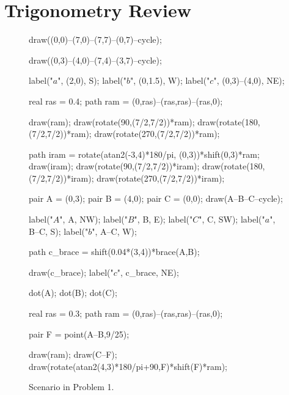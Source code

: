 \documentclass[../gatm.tex]{subfiles}
\begin{document}
\section{Trigonometry Review}

\begin{figure}[h]
	\begin{minipage}{0.45\textwidth}\centering
		\begin{center}
			\begin{asy}[width=\textwidth]
				draw((0,0)--(7,0)--(7,7)--(0,7)--cycle);
				
				draw((0,3)--(4,0)--(7,4)--(3,7)--cycle);
				
				label("$a$", (2,0), S);
				label("$b$", (0,1.5), W);
				label("$c$", (0,3)--(4,0), NE);
				
				real ras = 0.4;
				path ram = (0,ras)--(ras,ras)--(ras,0);
				
				draw(ram);
				draw(rotate(90,(7/2,7/2))*ram);
				draw(rotate(180,(7/2,7/2))*ram);
				draw(rotate(270,(7/2,7/2))*ram);
				
				path iram = rotate(atan2(-3,4)*180/pi, (0,3))*shift(0,3)*ram;
				draw(iram);
				draw(rotate(90,(7/2,7/2))*iram);
				draw(rotate(180,(7/2,7/2))*iram);
				draw(rotate(270,(7/2,7/2))*iram);
			\end{asy}
			\caption{Scenario in Problem 1.}
			\label{fig:square_inscribed}
		\end{center}
	\end{minipage}\hfill
	\begin{minipage}{0.45\textwidth}\centering
		\begin{center}
			\begin{asy}[width=\textwidth]
				pair A = (0,3);
				pair B = (4,0);
				pair C = (0,0);
				draw(A--B--C--cycle);
				
				label("$A$", A, NW);
				label("$B$", B, E);
				label("$C$", C, SW);
				label("$a$", B--C, S);
				label("$b$", A--C, W);
				
				path c_brace = shift(0.04*(3,4))*brace(A,B);
				
				draw(c_brace);
				label("$c$", c_brace, NE);
				
				dot(A);
				dot(B);
				dot(C);
				
				real ras = 0.3;
				path ram = (0,ras)--(ras,ras)--(ras,0);
				
				pair F = point(A--B,9/25);
				
				draw(ram);
				draw(C--F);
				draw(rotate(atan2(4,3)*180/pi+90,F)*shift(F)*ram);
				

\end{asy}
\end{center}
\end{minipage}
\end{figure}
\end{document}
